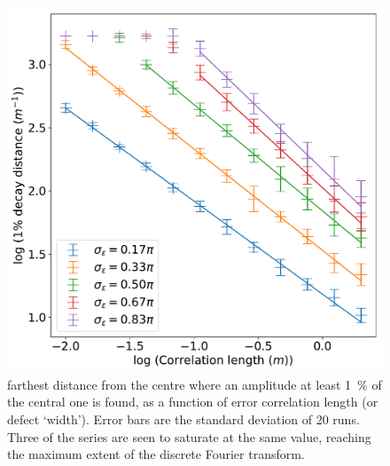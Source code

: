 \documentclass{article}
\begin{document}
\begin{figure}
\begin{minipage}{0.48\textwidth}
        \includegraphics[width=\textwidth]{pictures/corr/dist.pdf}
        \caption{farthest distance from the centre where an amplitude at least \SI{1}{\percent} of the central one is found, as a function of error correlation length (or defect `width'). Error bars are the standard deviation of 20 runs. Three of the series are seen to saturate at the same value, reaching the maximum extent of the discrete Fourier transform.}\label{fig:corr:dist}
    \end{minipage}
\end{figure}
\end{document}
